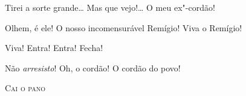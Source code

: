 \begin{linenumbers}



 Tirei a sorte grande\ldots{} Mas que vejo!\ldots{} O meu ex"-cordão!

 Olhem, é ele! O nosso incomensurável Remígio! Viva o
Remígio! 

 Viva! Entra! Entra! Fecha!  

 Não \textit{arresisto}! Oh, o cordão! O cordão do povo!



\bigskip

\begin{center}
\textsc{Cai o pano}
\end{center}


\end{linenumbers}
